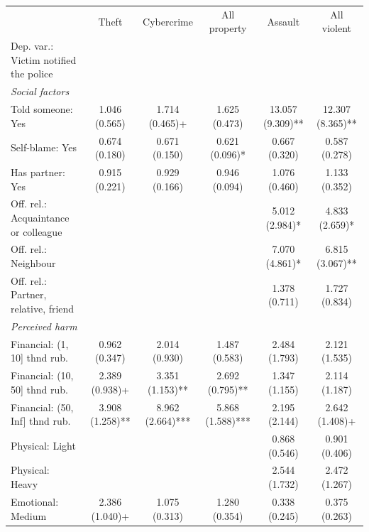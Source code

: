 
	\begin{tabular}{lccccc}
		\toprule
		& Theft & Cybercrime & All property & Assault & All violent\\
		Dep. var.: Victim notified the police & & & & & \\
		\midrule
		\textit{Social factors} & & & & & \\
		Told someone: Yes & \num{1.046} (\num{0.565}) & \num{1.714} (\num{0.465})+ & \num{1.625} (\num{0.473}) & \num{13.057} (\num{9.309})** & \num{12.307} (\num{8.365})**\\
		Self-blame: Yes & \num{0.674} (\num{0.180}) & \num{0.671} (\num{0.150}) & \num{0.621} (\num{0.096})* & \num{0.667} (\num{0.320}) & \num{0.587} (\num{0.278})\\
		Has partner: Yes & \num{0.915} (\num{0.221}) & \num{0.929} (\num{0.166}) & \num{0.946} (\num{0.094}) & \num{1.076} (\num{0.460}) & \num{1.133} (\num{0.352})\\
		Off. rel.: Acquaintance or colleague &  &  &  & \num{5.012} (\num{2.984})* & \num{4.833} (\num{2.659})*\\
		Off. rel.: Neighbour &  &  &  & \num{7.070} (\num{4.861})* & \num{6.815} (\num{3.067})**\\
		Off. rel.: Partner, relative, friend &  &  &  & \num{1.378} (\num{0.711}) & \num{1.727} (\num{0.834})\\
		\midrule
		\textit{Perceived harm} & & & & & \\
		Financial: (1, 10] thnd rub. & \num{0.962} (\num{0.347}) & \num{2.014} (\num{0.930}) & \num{1.487} (\num{0.583}) & \num{2.484} (\num{1.793}) & \num{2.121} (\num{1.535})\\
		Financial: (10, 50] thnd rub. & \num{2.389} (\num{0.938})+ & \num{3.351} (\num{1.153})** & \num{2.692} (\num{0.795})** & \num{1.347} (\num{1.155}) & \num{2.114} (\num{1.187})\\
		Financial: (50, Inf] thnd rub. & \num{3.908} (\num{1.258})** & \num{8.962} (\num{2.664})*** & \num{5.868} (\num{1.588})*** & \num{2.195} (\num{2.144}) & \num{2.642} (\num{1.408})+\\
		Physical: Light &  &  &  & \num{0.868} (\num{0.546}) & \num{0.901} (\num{0.406})\\
		Physical: Heavy &  &  &  & \num{2.544} (\num{1.732}) & \num{2.472} (\num{1.267})\\
		Emotional: Medium & \num{2.386} (\num{1.040})+ & \num{1.075} (\num{0.313}) & \num{1.280} (\num{0.354}) & \num{0.338} (\num{0.245}) & \num{0.375} (\num{0.263})\\

\end{tabular}
